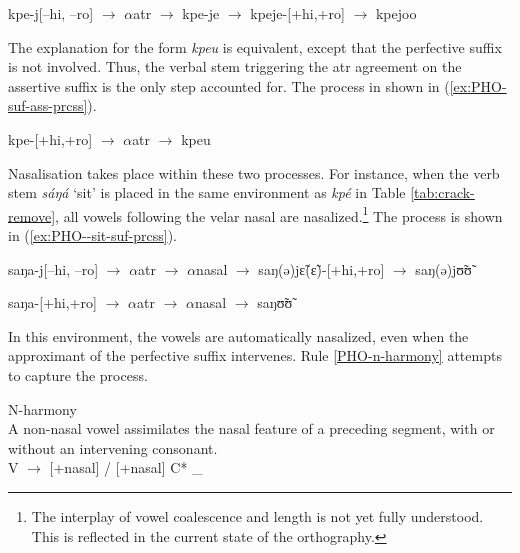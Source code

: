 \begin{exe}
\ex\label{ex:PHO-suf-perf-ass-prcss}
kpe-j[{\sc  --hi, --ro}]  $\rightarrow$  $\alpha${\sc atr} $\rightarrow$ kpe-je 
 $\rightarrow$
kpeje-[{\sc +hi,+ro}]  $\rightarrow$  kpejoo
\end{exe}

The explanation for the form {\it kpeu} is equivalent, except that the
perfective suffix is not involved. Thus,  the verbal stem triggering the {\sc
atr} agreement on the assertive suffix is the only step  accounted
for. The process in shown in (\ref{ex:PHO-suf-ass-prcss}).


\begin{exe}
\ex\label{ex:PHO-suf-ass-prcss}
kpe-[{\sc +hi,+ro}]  $\rightarrow$  $\alpha${\sc atr} $\rightarrow$ kpeu
\end{exe}

Nasalisation takes place within these two processes. For instance, when the verb 
stem {\it sáŋá} `sit' is placed in the same environment as {\it kpé} in 
Table 
\ref{tab:crack-remove}, all vowels following the velar nasal are 
nasalized.\footnote{The interplay of vowel coalescence and  length is not yet 
fully understood. This is reflected in the current state of the orthography.}  
The process is shown in (\ref{ex:PHO--sit-suf-prcss}).

\begin{exe}
\ex\label{ex:PHO--sit-suf-prcss}
\begin{xlist}

\ex\label{ex:PHO-sit-suf-perf-ass-prcss}
 saŋa-j[{\sc  --hi, --ro}]  $\rightarrow$   $\alpha${\sc atr} $\rightarrow$  
$\alpha${\sc nasal}
$\rightarrow$  saŋ(ə)jɛ̃(ɛ̃)-[{\sc +hi,+ro}]  $\rightarrow$  saŋ(ə)jʊ̃ʊ̃

\ex\label{ex:PHO--sit-suf-ass-prcss}
saŋa-[{\sc +hi,+ro}]   $\rightarrow$  $\alpha${\sc atr}  $\rightarrow$  
$\alpha${\sc nasal} $\rightarrow$ saŋʊ̃ʊ̃
\end{xlist}
\end{exe}

In this environment, the vowels are  automatically nasalized, even when the
approximant of the perfective suffix intervenes. Rule \ref{PHO-n-harmony}
attempts to capture the process.

\begin{Rule}\label{PHO-n-harmony}{N-harmony}\\
A non-nasal vowel assimilates the nasal feature of a preceding segment, with or
without an intervening consonant. \\
 V $\rightarrow$  [{\sc +nasal}] /  [{\sc +nasal}] C*  \_  
\end{Rule}




